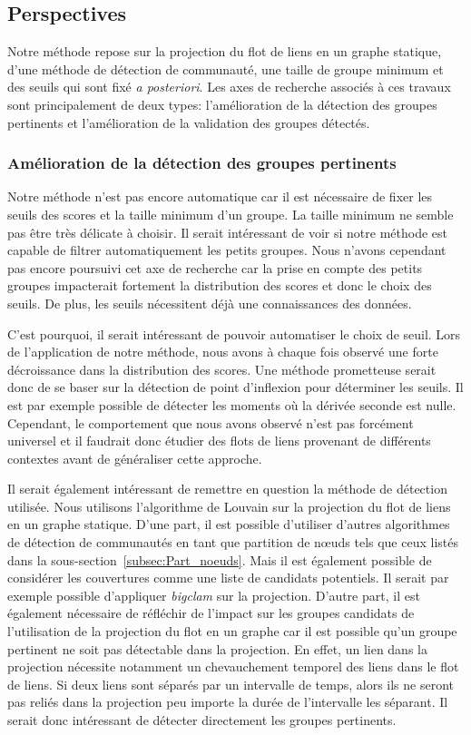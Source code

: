 \subsection{Perspectives}

Notre méthode repose sur la projection du flot de liens en un graphe statique, d'une méthode de détection de communauté, une taille de groupe minimum et des seuils qui sont fixé \emph{a posteriori}.
Les axes de recherche associés à ces travaux sont principalement de deux types: l'amélioration de la détection des groupes pertinents et l'amélioration de la validation des groupes détectés.

\subsubsection{Amélioration de la détection des groupes pertinents}
Notre méthode n'est pas encore automatique car il est nécessaire de fixer les seuils des scores et la taille minimum d'un groupe.
La taille minimum ne semble pas être très délicate à choisir.
Il serait intéressant de voir si notre méthode est capable de filtrer automatiquement les petits groupes.
Nous n'avons cependant pas encore poursuivi cet axe de recherche car la prise en compte des petits groupes impacterait fortement la distribution des scores et donc le choix des seuils.
De plus, les seuils nécessitent déjà une connaissances des données.

C'est pourquoi, il serait intéressant de pouvoir automatiser le choix de seuil.
Lors de l'application de notre méthode, nous avons à chaque fois observé une forte décroissance dans la distribution des scores.
Une méthode prometteuse serait donc de se baser sur la détection de point d'inflexion pour déterminer les seuils.
Il est par exemple possible de détecter les moments où la dérivée seconde est nulle.
Cependant, le comportement que nous avons observé n'est pas forcément universel et il faudrait donc étudier des flots de liens provenant de différents contextes avant de généraliser cette approche.


Il serait également intéressant de remettre en question la méthode de détection utilisée.
Nous utilisons l'algorithme de Louvain sur la projection du flot de liens en un graphe statique.
D'une part, il est possible d'utiliser d'autres algorithmes de détection de communautés en tant que partition de n\oe uds tels que ceux listés dans la sous-section~\ref{subsec:Part_noeuds}.
Mais il est également possible de considérer les couvertures comme une liste de candidats potentiels.
Il serait par exemple possible d'appliquer \emph{bigclam} sur la projection.
D'autre part, il est également nécessaire de réfléchir de l'impact sur les groupes candidats de l'utilisation de la projection du flot en un graphe car il est possible qu'un groupe pertinent ne soit pas détectable dans la projection.
En effet, un lien dans la projection nécessite notamment un chevauchement temporel des liens dans le flot de liens.
Si deux liens sont séparés par un intervalle de temps, alors ils ne seront pas reliés dans la projection peu importe la durée de l'intervalle les séparant.
Il serait donc intéressant de détecter directement les groupes pertinents.


